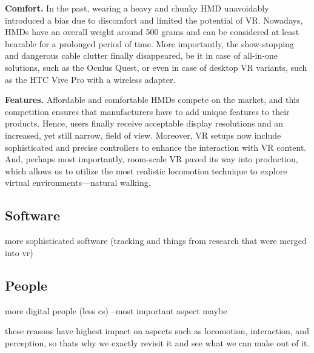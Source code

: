 \textbf{Comfort.} In the past, wearing a heavy and chunky HMD unavoidably introduced a bias due to discomfort and limited the potential of VR. Nowadays, HMDs have an overall weight around 500 grams and can be considered at least bearable for a prolonged period of time. More importantly, the show-stopping and dangerous cable clutter finally disappeared, be it in case of all-in-one solutions, such as the Oculus Quest, or even in case of desktop VR variants, such as the HTC Vive Pro with a wireless adapter. 





\textbf{Features.} Affordable and comfortable HMDs compete on the market, and this competition ensures that manufacturers have to add unique features to their products. Hence, users finally receive acceptable display resolutions and an increased, yet still narrow, field of view. Moreover, VR setups now include sophisticated and precise controllers to enhance the interaction with VR content. And, perhaps most importantly, room-scale VR paved its way into production, which allows us to utilize the most realistic locomotion technique to explore virtual environments---natural walking.







\subsection{Software}
more sophisticated software (tracking and things from research that were merged into vr)

\subsection{People}
more digital people (less cs) --most important aspect maybe


these reasons have highest impact on aspects such as locomotion, interaction, and perception, so thats why we exactly revisit it and see what we can make out of it.









